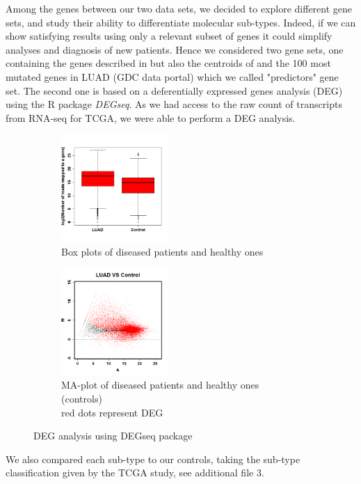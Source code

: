\documentclass[twocolumn]{article}
\begin{document}
Among the genes between our two data sets, we decided to explore different gene sets, and study their ability to differentiate molecular sub-types. Indeed, if we can show satisfying results using only a relevant subset of genes it could simplify analyses and diagnosis of new patients.
Hence we considered two gene sets, one containing the genes described in \cite{hayes} but also the centroids of \cite{wilk} and the 100 most mutated genes in LUAD (GDC data portal) which we called "predictors" gene set. The second one is based on a deferentially expressed genes analysis (DEG) using the R package \emph{DEGseq}.
As we had access to the raw count of transcripts from RNA-seq for TCGA, we were able to perform a DEG analysis.
\begin{figure}[th]
    \centering
    \begin{subfigure}[t]{0.20\textwidth}
        \centering
        \includegraphics[height=1.6in]{img/SampleS_box.png}
        \caption{Box plots of diseased patients and healthy ones}
        \label{fig:my_label}
    \end{subfigure}
    \begin{subfigure}[t]{0.20\textwidth}
        \centering
        \includegraphics[height=1.6in]{img/result.png}
        \caption{MA-plot of diseased patients and healthy ones (controls)\\
        red dots represent DEG}
        \label{fig:my_label}
    \end{subfigure}
    \caption{DEG analysis using DEGseq package}
    \label{fig:my_label}
\end{figure}
We also compared each sub-type to our controls, taking the sub-type classification given by the TCGA study\cite{TCGA}, see additional file 3.
\end{document}
